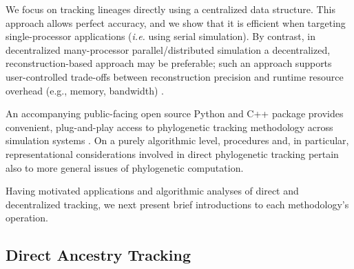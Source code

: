 
We focus on tracking lineages directly using a centralized data structure.
This approach allows perfect accuracy, and we show that it is efficient when targeting single-processor applications (\textit{i.e.} using serial simulation).
By contrast, in decentralized many-processor parallel/distributed simulation a decentralized, reconstruction-based approach may be preferable;
such an approach supports user-controlled trade-offs between reconstruction precision and runtime resource overhead (e.g., memory, bandwidth) \citep{moreno2022hstrat,moreno2026trust,moreno2022hereditary}.

An accompanying public-facing open source Python and C++ package provides convenient, plug-and-play access to phylogenetic tracking methodology across simulation systems \citep{dolson2024phylotrack}.
On a purely algorithmic level, procedures and, in particular, representational considerations involved in direct phylogenetic tracking pertain also to more general issues of phylogenetic computation.

Having motivated applications and algorithmic analyses of direct and decentralized tracking, we next present brief introductions to each methodology's operation.

\subsection{Direct Ancestry Tracking}

